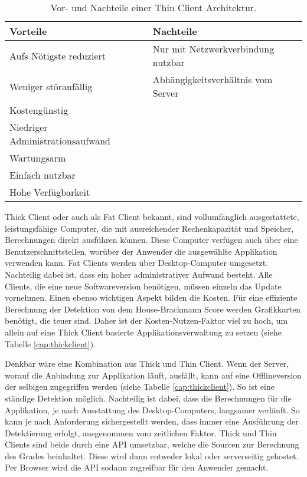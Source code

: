 \begin{table}[b]\vspace{1ex}\centering
  \begin{tabular*}{14cm}{l|l}
  \textbf{Vorteile} & \textbf{Nachteile}
  \\\hline\hline
  Aufs Nötigste reduziert          & Nur mit Netzwerkverbindung nutzbar   \\
  Weniger störanfällig             & Abhängigkeitsverhältnis vom Server   \\
  Kostengünstig                    &                                      \\
  Niedriger Administrationsaufwand &                                      \\
  Wartungsarm                      &                                      \\
  Einfach nutzbar                  &                                      \\
  Hohe Verfügbarkeit               &
  \\\hline
  \end{tabular*}
  \caption[Vor- und Nachteile von Thin Client]{Vor- und Nachteile einer Thin Client Architektur.}\label{cap:thinclient}
\vspace{1ex}\end{table}\label{table:thinclient}

\clearpage
Thick Client oder auch als Fat Client bekannt, sind vollumfänglich ausgestattete, leistungsfähige Computer, die mit ausreichender Rechenkapazität und Speicher, Berechnungen direkt ausführen können. Diese Computer verfügen auch über eine Benutzerschnittstellen, worüber der Anwender die ausgewählte Applikation verwenden kann. Fat Clients werden über Desktop-Computer umgesetzt. Nachteilig dabei ist, dass ein hoher administrativer Aufwand besteht. Alle Clients, die eine neue Softwareversion benötigen, müssen einzeln das Update vornehmen. Einen ebenso wichtigen Aspekt bilden die Kosten. Für eine effiziente Berechnung der Detektion von dem House-Brackmann Score werden Grafikkarten benötigt, die teuer sind. Daher ist der Kosten-Nutzen-Faktor viel zu hoch, um allein auf eine Thick Client basierte Applikationsverwaltung zu setzen (siehe Tabelle \ref{cap:thickclient}).

Denkbar wäre eine Kombination aus Thick und Thin Client. Wenn der Server, worauf die Anbindung zur Applikation läuft, ausfällt, kann auf eine Offlineversion der selbigen zugegriffen werden (siehe Tabelle \ref{cap:thickclient}). So ist eine ständige Detektion möglich. Nachteilig ist dabei, dass die Berechnungen für die Applikation, je nach Ausstattung des Desktop-Computers, langsamer verläuft. So kann je nach Anforderung sichergestellt werden, dass immer eine Ausführung der Detektierung erfolgt, ausgenommen vom zeitlichen Faktor. Thick und Thin Clients sind beide durch eine API umsetzbar, welche die Sourcen zur Berechnung des Grades beinhaltet. Diese wird dann entweder lokal oder serverseitig gehostet. Per Browser wird die API sodann zugreifbar für den Anwender gemacht.

